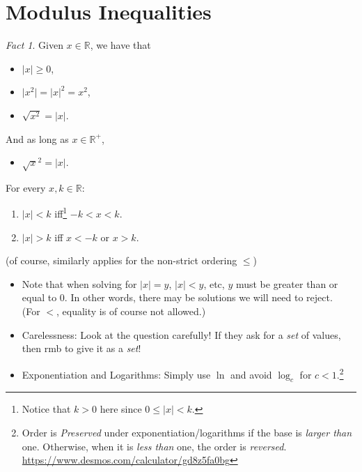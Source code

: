 \documentclass[oneside]{book}
\theoremstyle{definition}
\theoremstyle{plain}
\theoremstyle{remark}
\newtheorem*{fact}{Fact}
\theoremstyle{plain}
\begin{document}
\section{Modulus Inequalities}
\begin{fact}
    Given \(x \in \mathbb{R}\), we have that 
    \begin{itemize}
        \item \(\lvert x \rvert \geq 0\),
        \item \(\lvert x^2 \rvert=\lvert x \rvert^2=x^2\),
        \item \(\sqrt{x^2}=\lvert x \rvert\).
    \end{itemize}
    And as long as \(x \in \mathbb{R}^+\),
    \begin{itemize}
        \item \(\sqrt{x}^2=\lvert x \rvert\).
    \end{itemize}
\end{fact}
\begin{tcolorbox}[
    colback=yellow!20,
    boxrule=1pt,
    boxsep=1pt,
    left=2pt,right=2pt,top=2pt,bottom=2pt,
    oversize=2pt,
    colframe=blue!75!black,
    before skip=\topsep,
    after skip=\topsep,
    title=Useful Properties,
]
    For every \(x,k \in \mathbb{R}\):
    \begin{enumerate}[label=(\alph*)]
        \item \(\lvert x \rvert < k\) iff\footnote{Notice that \(k>0\) here since \(0 \leq \lvert x \rvert < k\).} \(-k<x<k\).
        \item \(\lvert x \rvert > k\) iff \(x<-k\) or \(x>k\).
    \end{enumerate}
    \footnotesize (of course, similarly applies for the non-strict ordering \(\leq\)) \normalsize
\end{tcolorbox}
\begin{IN}
    \begin{itemize}[label=\(\circ\)]
        \item Note that when solving for \(\lvert x \rvert=y\), \(\lvert x \rvert < y\), etc, \(y\) must be greater than or equal to 0. In other words, there may be solutions we will need to reject.\\ \footnotesize(For \(<\), equality is of course not allowed.)\normalsize  
    \end{itemize}
\end{IN}
\begin{IN}
\begin{itemize}[label=\scriptsize\(\triangle\)\normalsize]
  \item Carelessness: Look at the question carefully! If they ask for a \emph{set} of values, then rmb to give it as a \emph{set}!
  \item Exponentiation and Logarithms: Simply use \(\ln\) and avoid \(\log_c\) for \(c<1\).\footnote{Order is \emph{Preserved} under exponentiation/logarithms if the base is \emph{larger than} one. Otherwise, when it is \emph{less than} one, the order is \emph{reversed}. \url{https://www.desmos.com/calculator/gd8z5fa0bg}}
\end{itemize}
\end{IN}
\end{document}
